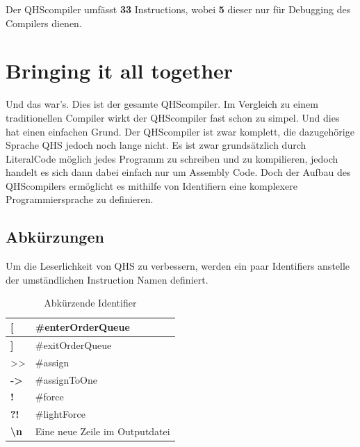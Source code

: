 Der QHScompiler umfässt \textbf{33} Instructions, wobei \textbf{5} dieser nur für Debugging des Compilers dienen.

\section{Bringing it all together} \label{sec:qhs-bringing-it-together}
Und das war's. Dies ist der gesamte QHScompiler. Im Vergleich zu einem traditionellen Compiler wirkt der QHScompiler fast schon zu simpel. Und dies hat einen einfachen Grund. Der QHScompiler ist zwar komplett,
die dazugehörige Sprache QHS jedoch noch lange nicht. Es ist zwar grundsätzlich durch LiteralCode möglich jedes Programm zu schreiben und zu kompilieren, jedoch handelt es sich dann dabei einfach nur um Assembly Code.
Doch der Aufbau des QHScompilers ermöglicht es mithilfe von Identifiern eine komplexere Programmiersprache zu definieren.

\subsection{Abkürzungen}
Um die Leserlichkeit von QHS zu verbessern, werden ein paar Identifiers anstelle der umständlichen Instruction Namen definiert.

{
\begin{table}[H]
    \centering
    \caption{Abkürzende Identifier}
    \vspace{3mm} %
    
    \begin{tabular}{>{\listingFont\selectfont}l|l}
    \textbf{{[}}                 & \#enterOrderQueue              \\ \hline
    \textbf{{]}}                 & \#exitOrderQueue               \\ \hline
    \textgreater{}\textgreater{} & \#assign                       \\ \hline
    \textbf{-\textgreater{}}     & \#assignToOne                  \\ \hline
    \textbf{!}                   & \#force                        \\ \hline
    \textbf{?!}                  & \#lightForce                   \\ \hline
    \textbf{\textbackslash{}n}   & Eine neue Zeile im Outputdatei
    \end{tabular}
\end{table}
}

